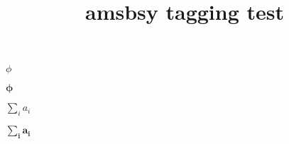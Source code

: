 \documentclass{article}
\title{amsbsy tagging test}
\begin{document}
$\phi$

$\boldsymbol{\phi}$

$\sum_i a_i$

$\pmb{\sum_i a_i}$
\end{document}
